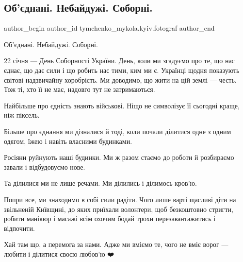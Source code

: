  
 
 
 
 

\subsection{Об'єднані. Небайдужі. Соборні.}
\label{sec:22_01_2023.fb.tymchenko_mykola.kyiv.fotograf.1.ob_dnan___nebaiduzh}

\ifcmt
 author_begin
   author_id tymchenko_mykola.kyiv.fotograf
 author_end
\fi

Об'єднані. Небайдужі. Соборні.

22 січня — День Соборності України. День, коли ми згадуємо про те, що нас
єднає, що дає сили і що робить нас тими, ким ми є. Українці щодня показують
світові надзвичайну хоробрість. Ми доводимо, що жити на цій землі — честь. Тож
ті, хто її не має, надовго тут не затримаються. 

Найбільше про єдність знають військові. Ніщо не символізує її сьогодні краще,
ніж піксель.

Більше про єднання ми дізналися й тоді, коли почали ділитися одне з одним
одягом, їжею і навіть власними будинками. 

Росіяни руйнують наші будинки. Ми ж разом стаємо до роботи й розбираємо завали
і відбудовуємо нове.

Та ділилися ми не лише речами. Ми ділились і ділимось кров'ю. 

Попри все, ми знаходимо в собі сили радіти. Чого лише варті щасливі діти на
звільненій Київщині, до яких приїхали волонтери, щоб безкоштовно стригти,
робити манікюр і масажі всім охочим бодай трохи перезавантажитись і відпочити.

Хай там що, а перемога за нами. Адже ми вміємо те, чого не вміє ворог — любити
і ділитися своєю любов'ю ❤️
